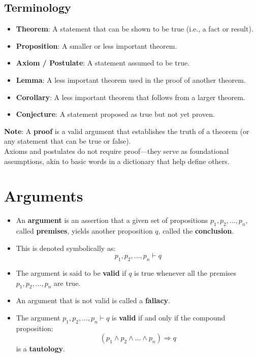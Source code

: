 \documentclass[
]{book}
\providecommand{\tightlist}{%
  \setlength{\itemsep}{0pt}\setlength{\parskip}{0pt}}
\theoremstyle{definition}
\theoremstyle{definition}
\theoremstyle{definition}
\theoremstyle{definition}
\theoremstyle{remark}
\begin{document}
\subsection{Terminology}\label{terminology-1}

\begin{itemize}
\tightlist
\item
  \textbf{Theorem}: A statement that can be shown to be true (i.e., a fact or result).
\item
  \textbf{Proposition}: A smaller or less important theorem.
\item
  \textbf{Axiom / Postulate}: A statement assumed to be true.
\item
  \textbf{Lemma}: A less important theorem used in the proof of another theorem.
\item
  \textbf{Corollary}: A less important theorem that follows from a larger theorem.
\item
  \textbf{Conjecture}: A statement proposed as true but not yet proven.
\end{itemize}

\textbf{Note}: A \textbf{proof} is a valid argument that establishes the truth of a theorem (or any statement that can be true or false).\\
Axioms and postulates do not require proof---they serve as foundational assumptions, akin to basic words in a dictionary that help define others.

\section{Arguments}\label{arguments}

\begin{itemize}
\item
  An \textbf{argument} is an assertion that a given set of propositions \(p_1, p_2, \ldots, p_n\), called \textbf{premises}, yields another proposition \(q\), called the \textbf{conclusion}.
\item
  This is denoted symbolically as:
  \[
  p_1, p_2, \ldots, p_n \vdash q
  \]
\item
  The argument is said to be \textbf{valid} if \(q\) is true whenever all the premises \(p_1, p_2, \ldots, p_n\) are true.
\item
  An argument that is not valid is called a \textbf{fallacy}.
\item
  The argument \(p_1, p_2, \ldots, p_n \vdash q\) is \textbf{valid} if and only if the compound proposition:
  \[
  (p_1 \land p_2 \land \ldots \land p_n) \Rightarrow q
  \]
  is a \textbf{tautology}.
\end{itemize}
\end{document}
